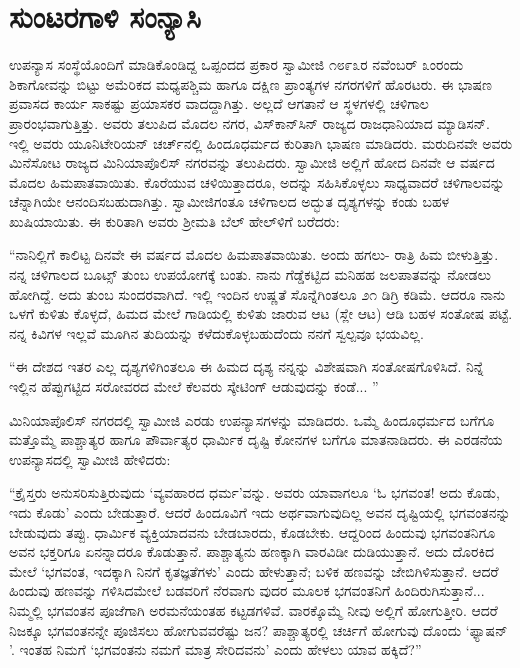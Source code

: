 
\chapter{ಸುಂಟರಗಾಳಿ ಸಂನ್ಯಾಸಿ}

\noindent

ಉಪನ್ಯಾಸ ಸಂಸ್ಥೆಯೊಂದಿಗೆ ಮಾಡಿಕೊಂಡಿದ್ದ ಒಪ್ಪಂದದ ಪ್ರಕಾರ ಸ್ವಾಮೀಜಿ ೧೮೯೩ರ ನವೆಂಬರ್ ೩ಂರಂದು ಶಿಕಾಗೋವನ್ನು ಬಿಟ್ಟು ಅಮೆರಿಕದ ಮಧ್ಯಪಶ್ಚಿಮ ಹಾಗೂ ದಕ್ಷಿಣ ಪ್ರಾಂತ್ಯಗಳ ನಗರಗಳಿಗೆ ಹೊರಟರು. ಈ ಭಾಷಣ ಪ್ರವಾಸದ ಕಾರ್ಯ ಸಾಕಷ್ಟು ಪ್ರಯಾಸಕರ ವಾದದ್ದಾಗಿತ್ತು. ಅಲ್ಲದೆ ಆಗತಾನೆ ಆ ಸ್ಥಳಗಳಲ್ಲಿ ಚಳಿಗಾಲ ಪ್ರಾರಂಭವಾಗುತ್ತಿತ್ತು. ಅವರು ತಲುಪಿದ ಮೊದಲ ನಗರ, ವಿಸ್​ಕಾನ್​ಸಿನ್ ರಾಜ್ಯದ ರಾಜಧಾನಿಯಾದ ಮ್ಯಾಡಿಸನ್. ಇಲ್ಲಿ ಅವರು ಯೂನಿಟೇರಿಯನ್ ಚರ್ಚ್​ನಲ್ಲಿ ಹಿಂದೂಧರ್ಮದ ಕುರಿತಾಗಿ ಭಾಷಣ ಮಾಡಿದರು. ಮರುದಿನವೇ ಅವರು ಮಿನೆಸೋಟ ರಾಜ್ಯದ ಮಿನಿಯಾಪೊಲಿಸ್ ನಗರವನ್ನು ತಲುಪಿದರು. ಸ್ವಾಮೀಜಿ ಅಲ್ಲಿಗೆ ಹೋದ ದಿನವೇ ಆ ವರ್ಷದ ಮೊದಲ ಹಿಮಪಾತವಾಯಿತು. ಕೊರೆಯುವ ಚಳಿಯಿತ್ತಾದರೂ, ಅದನ್ನು ಸಹಿಸಿಕೊಳ್ಳಲು ಸಾಧ್ಯವಾದರೆ ಚಳಿಗಾಲವನ್ನು ಚೆನ್ನಾಗಿಯೇ ಆನಂದಿಸಬಹುದಾಗಿತ್ತು. ಸ್ವಾಮೀಜಿಗಂತೂ ಚಳಿಗಾಲದ ಅದ್ಭುತ ದೃಶ್ಯಗಳನ್ನು ಕಂಡು ಬಹಳ ಖುಷಿಯಾಯಿತು. ಈ ಕುರಿತಾಗಿ ಅವರು ಶ್ರೀಮತಿ ಬೆಲ್ ಹೇಲ್​ಳಿಗೆ ಬರೆದರು:

“ನಾನಿಲ್ಲಿಗೆ ಕಾಲಿಟ್ಟ ದಿನವೇ ಈ ವರ್ಷದ ಮೊದಲ ಹಿಮಪಾತವಾಯಿತು. ಅಂದು ಹಗಲು- ರಾತ್ರಿ ಹಿಮ ಬೀಳುತ್ತಿತ್ತು. ನನ್ನ ಚಳಿಗಾಲದ ಬೂಟ್ಸ್ ತುಂಬ ಉಪಯೋಗಕ್ಕೆ ಬಂತು. ನಾನು ಗೆಡ್ಡೆಕಟ್ಟಿದ ಮನಿಹಹ ಜಲಪಾತವನ್ನು ನೋಡಲು ಹೋಗಿದ್ದೆ. ಅದು ತುಂಬ ಸುಂದರವಾಗಿದೆ. ಇಲ್ಲಿ ಇಂದಿನ ಉಷ್ಣತೆ ಸೊನ್ನೆಗಿಂತಲೂ ೨೧ ಡಿಗ್ರಿ ಕಡಿಮೆ. ಆದರೂ ನಾನು ಒಳಗೆ ಕುಳಿತು ಕೊಳ್ಳದೆ, ಹಿಮದ ಮೇಲೆ ಗಾಡಿಯಲ್ಲಿ ಕುಳಿತು ಜಾರುವ ಆಟ (ಸ್ಲೇ ಆಟ) ಆಡಿ ಬಹಳ ಸಂತೋಷ ಪಟ್ಟೆ. ನನ್ನ ಕಿವಿಗಳ ಇಲ್ಲವೆ ಮೂಗಿನ ತುದಿಯನ್ನು ಕಳೆದುಕೊಳ್ಳಬಹುದೆಂದು ನನಗೆ ಸ್ವಲ್ಪವೂ ಭಯವಿಲ್ಲ.

“ಈ ದೇಶದ ಇತರ ಎಲ್ಲ ದೃಶ್ಯಗಳಿಗಿಂತಲೂ ಈ ಹಿಮದ ದೃಶ್ಯ ನನ್ನನ್ನು ವಿಶೇಷವಾಗಿ ಸಂತೋಷಗೊಳಿಸಿದೆ. ನಿನ್ನೆ ಇಲ್ಲಿನ ಹೆಪ್ಪುಗಟ್ಟಿದ ಸರೋವರದ ಮೇಲೆ ಕೆಲವರು ಸ್ಕೇಟಿಂಗ್ ಆಡುವುದನ್ನು ಕಂಡೆ... ”

ಮಿನಿಯಾಪೊಲಿಸ್ ನಗರದಲ್ಲಿ ಸ್ವಾಮೀಜಿ ಎರಡು ಉಪನ್ಯಾಸಗಳನ್ನು ಮಾಡಿದರು. ಒಮ್ಮೆ ಹಿಂದೂಧರ್ಮದ ಬಗೆಗೂ ಮತ್ತೊಮ್ಮೆ ಪಾಶ್ಚಾತ್ಯರ ಹಾಗೂ ಪೌರ್ವಾತ್ಯರ ಧಾರ್ಮಿಕ ದೃಷ್ಟಿ ಕೋನಗಳ ಬಗೆಗೂ ಮಾತನಾಡಿದರು. ಈ ಎರಡನೆಯ ಉಪನ್ಯಾಸದಲ್ಲಿ ಸ್ವಾಮೀಜಿ ಹೇಳಿದರು:

“ಕ್ರೈಸ್ತರು ಅನುಸರಿಸುತ್ತಿರುವುದು ‘ವ್ಯವಹಾರದ ಧರ್ಮ’ವನ್ನು. ಅವರು ಯಾವಾಗಲೂ ‘ಓ ಭಗವಂತ! ಅದು ಕೊಡು, ಇದು ಕೊಡು’ ಎಂದು ಬೇಡುತ್ತಾರೆ. ಆದರೆ ಹಿಂದೂವಿಗೆ ಇದು ಅರ್ಥವಾಗುವುದಿಲ್ಲ ಅವನ ದೃಷ್ಟಿಯಲ್ಲಿ ಭಗವಂತನನ್ನು ಬೇಡುವುದು ತಪ್ಪು. ಧಾರ್ಮಿಕ ವ್ಯಕ್ತಿಯಾದವನು ಬೇಡಬಾರದು, ಕೊಡಬೇಕು. ಆದ್ದರಿಂದ ಹಿಂದುವು ಭಗವಂತನಿಗೂ ಅವನ ಭಕ್ತರಿಗೂ ಏನನ್ನಾದರೂ ಕೊಡುತ್ತಾನೆ. ಪಾಶ್ಚಾತ್ಯನು ಹಣಕ್ಕಾಗಿ ವಾರವಿಡೀ ದುಡಿಯುತ್ತಾನೆ. ಅದು ದೊರಕಿದ ಮೇಲೆ ‘ಭಗವಂತ, ಇದಕ್ಕಾಗಿ ನಿನಗೆ ಕೃತಜ್ಞತೆಗಳು’ ಎಂದು ಹೇಳುತ್ತಾನೆ; ಬಳಿಕ ಹಣವನ್ನು ಜೇಬಿಗಿಳಿಸುತ್ತಾನೆ. ಆದರೆ ಹಿಂದುವು ಹಣವನ್ನು ಗಳಿಸಿದಮೇಲೆ ಬಡವರಿಗೆ ನೆರವಾಗು ವುದರ ಮೂಲಕ ಭಗವಂತನಿಗೆ ಹಿಂದಿರುಗಿಸುತ್ತಾನೆ... ನಿಮ್ಮಲ್ಲಿ ಭಗವಂತನ ಪೂಜೆಗಾಗಿ ಅರಮನೆಯಂತಹ ಕಟ್ಟಡಗಳಿವೆ. ವಾರಕ್ಕೊಮ್ಮೆ ನೀವು ಅಲ್ಲಿಗೆ ಹೋಗುತ್ತೀರಿ. ಆದರೆ ನಿಜಕ್ಕೂ ಭಗವಂತನನ್ನೇ ಪೂಜಿಸಲು ಹೋಗುವವರೆಷ್ಟು ಜನ? ಪಾಶ್ಚಾತ್ಯರಲ್ಲಿ ಚರ್ಚಿಗೆ ಹೋಗುವು ದೊಂದು ‘ಫ್ಯಾಷನ್​’. ಇಂತಹ ನಿಮಗೆ ‘ಭಗವಂತನು ನಮಗೆ ಮಾತ್ರ ಸೇರಿದವನು’ ಎಂದು ಹೇಳಲು ಯಾವ ಹಕ್ಕಿದೆ?”

